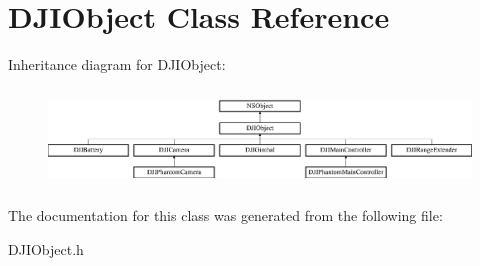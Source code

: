 \hypertarget{interface_d_j_i_object}{\section{D\+J\+I\+Object Class Reference}
\label{interface_d_j_i_object}
}
Inheritance diagram for D\+J\+I\+Object\+:\begin{figure}[H]
\begin{center}
\leavevmode
\includegraphics[height=2.619883cm]{interface_d_j_i_object}
\end{center}
\end{figure}


The documentation for this class was generated from the following file\+:\begin{DoxyCompactItemize}
\item 
D\+J\+I\+Object.\+h\end{DoxyCompactItemize}
